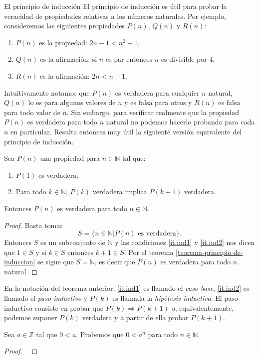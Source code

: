 \begin{section}{El principio de inducción}
El principio de inducción es útil para probar la veracidad de propiedades relativas a los números naturales. Por ejemplo, consideremos las siguientes propiedades $P(n)$, $Q(n)$ y $R(n)$:
\begin{enumerate}[label=\textit{\alph*)}]
\item $P(n)$ es la propiedad: $2n -1 < n^2 + 1$,
\item $Q(n)$ es la afirmación: si $n$ es par entonces $n$ es divisible por 4,
\item $R(n)$ es la afirmación: $2n < n- 1$.
\end{enumerate}
Intuitivamente notamos que $P(n)$ es verdadera para cualquier $n$ natural, $Q(n)$ lo es para algunos valores de $n$ y es falsa para otros y $R(n)$ es falsa para todo valor de $n$. Sin embargo, para verificar realmente que la propiedad $P(n)$ es verdadera para todo $n$ natural no podemos hacerlo probando para cada $n$ en particular. Resulta entonces muy útil la siguiente versión equivalente del principio de inducción.

\begin{teorema}\label{induccion2} Sea $P(n)$ una propiedad para $n \in \mathbb N$ tal que:
\begin{enumerate}[label=\textit{\alph*)}]
\item\label{it.ind1} $P(1)$ es verdadera.
\item\label{it.ind2} Para todo $k \in \mathbb N$, $P(k)$ verdadera implica $P(k + 1)$ verdadera.
\end{enumerate}
Entonces $P(n)$ es verdadera para todo $n \in \mathbb N$.
\end{teorema}
\begin{proof} Basta tomar
$$S = \{n \in \mathbb N| P(n) \text{ es verdadera} \}.$$
Entonces $S$ es un subconjunto de $\mathbb N$ y las condiciones \ref{it.ind1} y \ref{it.ind2} nos dicen que $1 \in S$ y  si $ k \in S$ entonces $k+1\in S$. Por el teorema \ref{teorema-principio-de-induccion} se sigue que $S= \mathbb N$, es decir que $P(n)$ es verdadera para todo $n$.
natural.
\end{proof}


En la notación del teorema anterior, \ref{it.ind1} es llamado  el \textit{caso base}, \ref{it.ind2} es llamado el  \textit{paso inductivo} y $P(k)$ es llamada la \textit{hipótesis inductiva}. El paso inductivo  consiste en probar que $P(k) \Rightarrow P(k + 1)$ o, equivalentemente, podemos suponer $P(k)$ verdadera y a partir de ella probar $P(k + 1)$. 


\begin{ejemplo}\label{ejemplo141} Sea $a\in \mathbb Z$ tal que $0<a$. Probemos que $0<a^n$ para todo $n \in \mathbb N$.
\end{ejemplo}
\begin{proof}
\


\end{proof}
\end{section}
